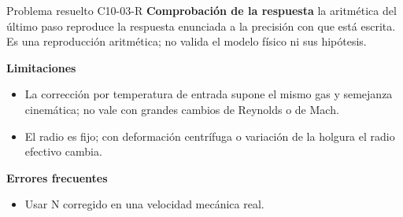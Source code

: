 \documentclass[10pt,openany]{book}
\begin{document}
\begin{studiumworked}{Problema resuelto C10-03-R}
\noindent\textbf{Comprobación de la respuesta} la aritmética del último paso reproduce la respuesta enunciada a la precisión con que está escrita. Es una reproducción aritmética; no valida el modelo físico ni sus hipótesis.

\noindent\textbf{Limitaciones}
\begin{itemize}
\item La corrección por temperatura de entrada supone el mismo gas y semejanza cinemática; no vale con grandes cambios de Reynolds o de Mach.
\item El radio es fijo; con deformación centrífuga o variación de la holgura el radio efectivo cambia.
\end{itemize}

\noindent\textbf{Errores frecuentes}
\begin{itemize}
\item Usar N corregido en una velocidad mecánica real.
\end{itemize}
\end{studiumworked}
\end{document}
